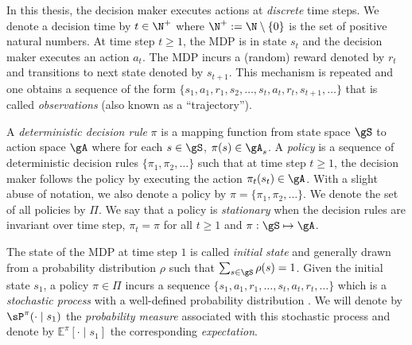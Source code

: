 In this thesis, the decision maker executes actions at \emph{discrete} time steps.
We denote a decision time by $t\in\N^+$ where $\N^+:=\N\setminus\{0\}$ is the set of positive natural numbers.
At time step $t\ge1$, the MDP is in state $s_t$ and the decision maker executes an action $a_t$.
The MDP incurs a (random) reward denoted by $r_t$ and transitions to next state denoted by $s_{t+1}$.
This mechanism is repeated and one obtains a sequence of the form $\{s_1,a_1,r_1,s_2,\dots,s_t,a_t,r_t,s_{t+1},\dots\}$ that is called \emph{observations} (also known as a ``trajectory'').

A \emph{deterministic decision rule} $\pi$ is a mapping function from state space $\gS$ to action space $\gA$ where for each $s\in\gS$, $\pi(s)\in\gA_s$.
A \emph{policy} is a sequence of deterministic decision rules $\{\pi_1,\pi_2,\dots\}$ such that at time step $t\ge1$, the decision maker follows the policy by executing the action $\pi_t(s_t)\in\gA$.
With a slight abuse of notation, we also denote a policy by $\pi=\{\pi_1,\pi_2,\dots\}$.
We denote the set of all policies by $\Pi$.
We say that a policy is \emph{stationary} when the decision rules are invariant over time step, $\pi_t=\pi$ for all $t\ge1$ and $\pi:\gS\mapsto\gA$.

The state of the MDP at time step $1$ is called \emph{initial state} and generally drawn from a probability distribution $\rho$ such that $\sum_{s\in\gS}\rho(s)=1$.
Given the initial state $s_1$, a policy $\pi\in\Pi$ incurs a sequence $\{s_1,a_1,r_1,\dots,s_t,a_t,r_t,\dots\}$ which is a \emph{stochastic process} with a well-defined probability distribution \cite[Section~2.1.6]{puterman2014markov}.
We will denote by $\sP^\pi(\cdot\mid s_1)$ the \emph{probability measure} associated with this stochastic process and denote by $\mathbb{E}^\pi[\cdot \mid s_1]$ the corresponding \emph{expectation}.

